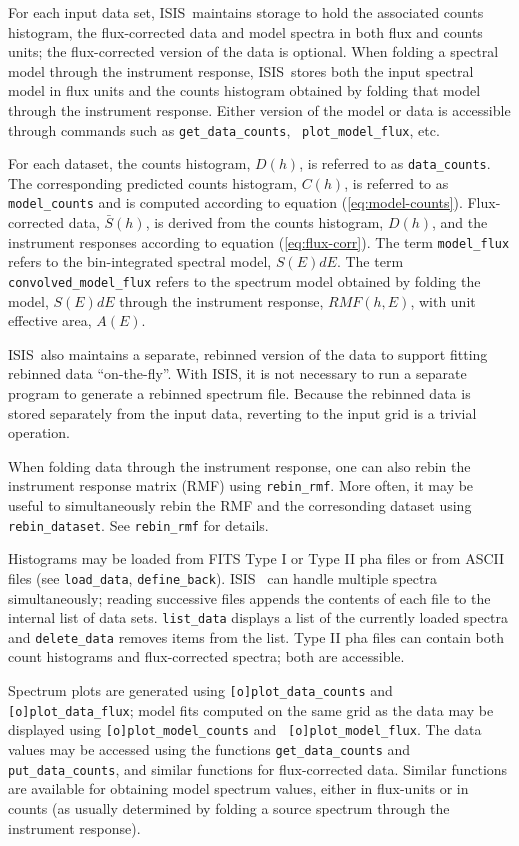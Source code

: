 \documentclass{book}
\newcommand{\isisx}{{\sc ISIS~}}
\newcommand{\isis}{{\sc ISIS}}
\begin{document}
For each input data set, \isisx maintains storage to hold the
associated counts histogram, the flux-corrected data and model spectra
in both flux and counts units; the flux-corrected version of the data
is optional.  When folding a spectral model through the instrument
response, \isisx stores both the input spectral model in flux units
and the counts histogram obtained by folding that model through the
instrument response.  Either version of the model or data is accessible
through commands such as {\tt get\_data\_counts}, {\tt
plot\_model\_flux}, etc.

For each dataset, the counts histogram, $D(h)$, is referred to
as \verb|data_counts|.  The corresponding predicted counts
histogram, $C(h)$, is referred to as \verb|model_counts| and is
computed according to equation (\ref{eq:model-counts}).
Flux-corrected data, ${\bar S(h)}$, is derived from the counts
histogram, $D(h)$, and the instrument responses according to
equation (\ref{eq:flux-corr}).  The term \verb|model_flux|
refers to the bin-integrated spectral model, $S(E)dE$. The term
\verb|convolved_model_flux| refers to the spectrum model
obtained by folding the model, $S(E)dE$ through the instrument
response, $RMF(h,E)$, with unit effective area, $A(E)$.

\isisx also maintains a separate, rebinned version of the data to
support fitting rebinned data ``on-the-fly''.  With \isis, it is not
necessary to run a separate program to generate a rebinned spectrum
file.  Because the rebinned data is stored separately from the input
data, reverting to the input grid is a trivial operation.

When folding data through the instrument response, one can also
rebin the instrument response matrix (RMF) using \verb|rebin_rmf|.
More often, it may be useful to simultaneously rebin the RMF and
the corresonding dataset using \verb|rebin_dataset|.
See \verb|rebin_rmf| for details.

Histograms may be loaded from FITS Type I or Type II pha files or
from ASCII files (see \verb|load_data|, \verb|define_back|).  \isisx
can handle multiple spectra simultaneously; reading successive
files appends the contents of each file to the internal list of
data sets.  {\tt list\_data} displays a list of the currently
loaded spectra and {\tt delete\_data} removes items from the list.
Type II pha files can contain both count histograms and
flux-corrected spectra; both are accessible.

Spectrum plots are generated using {\tt [o]plot\_data\_counts} and
{\tt [o]plot\_data\_flux}; model fits computed on the same grid as the
data may be displayed using {\tt [o]plot\_model\_counts} and {\tt
[o]plot\_model\_flux}.  The data values may be accessed using the
functions {\tt get\_data\_counts} and {\tt put\_data\_counts}, and
similar functions for flux-corrected data. Similar functions are
available for obtaining model spectrum values, either in flux-units or
in counts (as usually determined by folding a source spectrum through
the instrument response).
\end{document}
